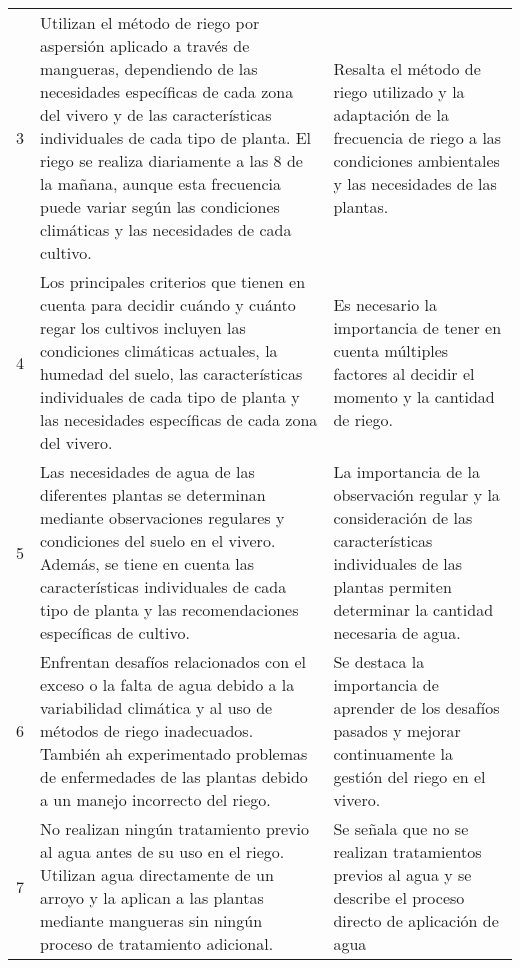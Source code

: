 \begin{longtable}{|p{0.5cm}|p{6.5cm}|p{5.5cm}|}
	3                                          & Utilizan el método de riego por aspersión aplicado a través de mangueras, dependiendo de las necesidades específicas de cada zona del vivero y de las características individuales de cada tipo de planta. El riego se realiza diariamente a las 8 de la mañana, aunque esta frecuencia puede variar según las condiciones climáticas y las necesidades de cada cultivo.      & Resalta el método de riego utilizado y la adaptación de la frecuencia de riego a las condiciones ambientales y las necesidades de las plantas.                                       \\
	4                                          & Los principales criterios que tienen en cuenta para decidir cuándo y cuánto regar los cultivos incluyen las condiciones climáticas actuales, la humedad del suelo, las características individuales de cada tipo de planta y las necesidades específicas de cada zona del vivero.                                                                                             & Es necesario la importancia de tener en cuenta múltiples factores al decidir el momento y la cantidad de riego.                                                                      \\
	5                                          & Las necesidades de agua de las diferentes plantas se determinan mediante observaciones regulares y condiciones del suelo en el vivero. Además, se tiene en cuenta las características individuales de cada tipo de planta y las recomendaciones específicas de cultivo.                                                                                                       & La importancia de la observación regular y la consideración de las características individuales de las plantas permiten determinar la cantidad necesaria de agua.                    \\
	6                                          & Enfrentan desafíos relacionados con el exceso o la falta de agua debido a la variabilidad climática y al uso de métodos de riego inadecuados. También ah experimentado problemas de enfermedades de las plantas debido a un manejo incorrecto del riego.                                                                                                                      & Se destaca la importancia de aprender de los desafíos pasados y mejorar continuamente la gestión del riego en el vivero.                                                             \\
	7                                          & No realizan ningún tratamiento previo al agua antes de su uso en el riego. Utilizan agua directamente de un arroyo y la aplican a las plantas mediante mangueras sin ningún proceso de tratamiento adicional.                                                                                                                                                                 & Se señala que no se realizan tratamientos previos al agua y se describe el proceso directo de aplicación de agua                                                                     \\
\end{longtable}